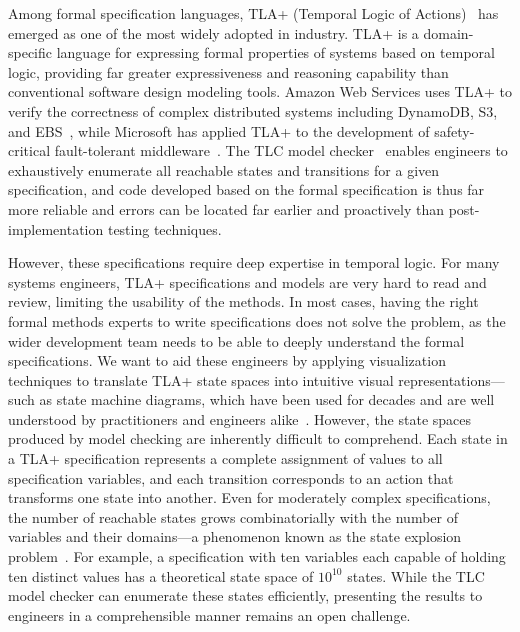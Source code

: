 \documentclass[conference]{IEEEtran}
\begin{document}
Among formal specification languages, TLA+ (Temporal Logic of Actions)~\cite{lamport2003specifying, lamport2009pluscal} has emerged as one of the most widely adopted in industry. TLA+ is a domain-specific language for expressing formal properties of systems based on temporal logic, providing far greater expressiveness and reasoning capability than conventional software design modeling tools. Amazon Web Services uses TLA+ to verify the correctness of complex distributed systems including DynamoDB, S3, and EBS~\cite{newcombe2015amazon}, while Microsoft has applied TLA+ to the development of safety-critical fault-tolerant middleware~\cite{resch2017tla}. The TLC model checker~\cite{yuan1999model} enables engineers to exhaustively enumerate all reachable states and transitions for a given specification, and code developed based on the formal specification is thus far more reliable and errors can be located far earlier and proactively than post-implementation testing techniques.

However, these specifications require deep expertise in temporal logic. For many systems engineers, TLA+ specifications and models are very hard to read and review, limiting the usability of the methods. In most cases, having the right formal methods experts to write specifications does not solve the problem, as the wider development team needs to be able to deeply understand the formal specifications. We want to aid these engineers by applying visualization techniques to translate TLA+ state spaces into intuitive visual representations---such as state machine diagrams, which have been used for decades and are well understood by practitioners and engineers alike~\cite{harel1987statecharts, harel1988visual}. However, the state spaces produced by model checking are inherently difficult to comprehend. Each state in a TLA+ specification represents a complete assignment of values to all specification variables, and each transition corresponds to an action that transforms one state into another. Even for moderately complex specifications, the number of reachable states grows combinatorially with the number of variables and their domains---a phenomenon known as the state explosion problem~\cite{liu2005model}. For example, a specification with ten variables each capable of holding ten distinct values has a theoretical state space of $10^{10}$ states. While the TLC model checker can enumerate these states efficiently, presenting the results to engineers in a comprehensible manner remains an open challenge.
\end{document}
